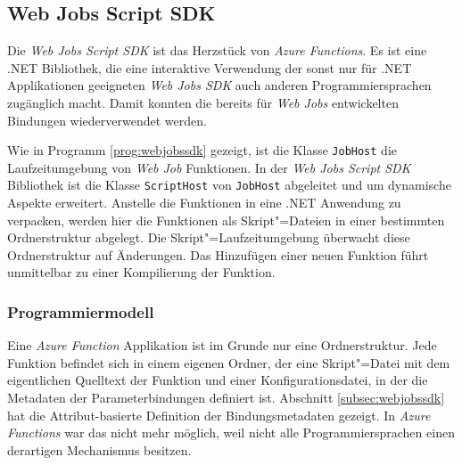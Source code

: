 \subsection{Web Jobs Script SDK}

Die \textit{Web Jobs Script SDK} ist das Herzstück von \textit{Azure Functions}. Es ist eine .NET Bibliothek, die eine interaktive Verwendung der sonst nur für .NET Applikationen geeigneten \textit{Web Jobs SDK} auch anderen Programmiersprachen zugänglich macht. Damit konnten die bereits für \textit{Web Jobs} entwickelten Bindungen wiederverwendet werden.

Wie in Programm \ref{prog:webjobssdk} gezeigt, ist die Klasse \lstinline{JobHost} die Laufzeitumgebung von \textit{Web Job} Funktionen. In der \textit{Web Jobs Script SDK} Bibliothek ist die Klasse \lstinline{ScriptHost} von \lstinline{JobHost} abgeleitet und um dynamische Aspekte erweitert. Anstelle die Funktionen in eine .NET Anwendung zu verpacken, werden hier die Funktionen als Skript"=Dateien in einer bestimmten Ordnerstruktur abgelegt. Die Skript"=Laufzeitumgebung überwacht diese Ordnerstruktur auf Änderungen. Das Hinzufügen einer neuen Funktion führt unmittelbar zu einer Kompilierung der Funktion.

\subsubsection{Programmiermodell}

Eine \textit{Azure Function} Applikation ist im Grunde nur eine Ordnerstruktur. Jede Funktion befindet sich in einem eigenen Ordner, der eine Skript"=Datei mit dem eigentlichen Quelltext der Funktion und einer Konfigurationsdatei, in der die Metadaten der Parameterbindungen definiert ist. Abschnitt \ref{subsec:webjobssdk} hat die Attribut-basierte Definition der Bindungsmetadaten gezeigt. In \textit{Azure Functions} war das nicht mehr möglich, weil nicht alle Programmiersprachen einen derartigen Mechanismus besitzen.

